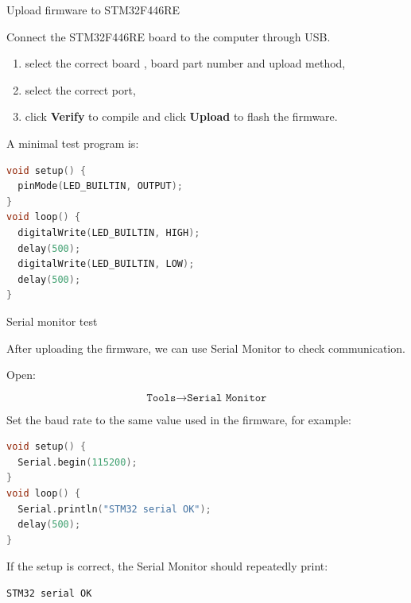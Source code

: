 \documentclass[aspectratio=169]{beamer}
\begin{document}
\begin{frame}[fragile]{Upload firmware to STM32F446RE}

Connect the STM32F446RE board to the computer through USB.





\begin{enumerate}
    \item select the correct board , board part number and upload method,
    \item select the correct port,
    
    \item click \textbf{Verify} to compile and click \textbf{Upload} to flash the firmware.
\end{enumerate}



A minimal test program is:

\begin{lstlisting}[language=C++]
void setup() {
  pinMode(LED_BUILTIN, OUTPUT);
}
void loop() {
  digitalWrite(LED_BUILTIN, HIGH);
  delay(500);
  digitalWrite(LED_BUILTIN, LOW);
  delay(500);
}
\end{lstlisting}

\end{frame}


\begin{frame}[fragile]{Serial monitor test}

After uploading the firmware, we can use Serial Monitor to check communication.



Open:

\[
\texttt{Tools}
\rightarrow
\texttt{Serial Monitor}
\]



Set the baud rate to the same value used in the firmware, for example:

\begin{lstlisting}[language=C++]
void setup() {
  Serial.begin(115200);
}
void loop() {
  Serial.println("STM32 serial OK");
  delay(500);
}
\end{lstlisting}

\vspace{0.15cm}

If the setup is correct, the Serial Monitor should repeatedly print:

\begin{lstlisting}[language=bash]
STM32 serial OK
\end{lstlisting}

\end{frame}
\end{document}
